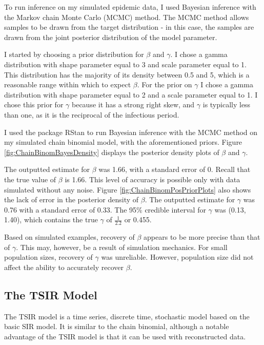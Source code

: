 \documentclass{article}
\begin{document}
To run inference on my simulated epidemic data, I used Bayesian inference with the Markov chain Monte Carlo (MCMC) method. The MCMC method allows samples to be drawn from the target distribution - in this case, the samples are drawn from the joint posterior distribution of the model parameter. 

I started by choosing a prior distribution for $\beta$ and $\gamma$. I chose a gamma distribution with shape parameter equal to 3 and scale parameter equal to 1. This distribution has the majority of its density between 0.5 and 5, which is a reasonable range within which to expect $\beta$. For the prior on $\gamma$ I chose a gamma distribution with shape parameter equal to 2 and a scale parameter equal to 1. I chose this prior for $\gamma$ because it has a strong right skew, and $\gamma$ is typically less than one, as it is the reciprocal of the infectious period. 

I used the package RStan to run Bayesian inference with the MCMC method on my simulated chain binomial model, with the aforementioned priors. Figure \ref{fig:ChainBinomBayesDensity} displays the posterior density plots of $\beta$ and $\gamma$. 


The outputted estimate for $\beta$ was 1.66, with a standard error of 0. Recall that the true value of $\beta$ is 1.66. This level of accuracy is possible only with data simulated without any noise. Figure \ref{fig:ChainBinomPosPriorPlots} also shows the lack of error in the posterior density of $\beta$. The outputted estimate for $\gamma$ was 0.76 with a standard error of 0.33. The 95\% credible interval for $\gamma$ was (0.13, 1.40), which contains the true $\gamma$ of $\frac{1}{2.2}$ or 0.455. 

Based on simulated examples, recovery of $\beta$ appears to be more precise than that of $\gamma$. This may, however, be a result of simulation mechanics. For small population sizes, recovery of $\gamma$ was unreliable. However, population size did not affect the ability to accurately recover $\beta$.  


\subsection{The TSIR Model} 

The TSIR model is a time series, discrete time, stochastic model based on the basic SIR model. It is similar to the chain binomial, although a notable advantage of the TSIR model is that it can be used with reconstructed data. 
\end{document}
